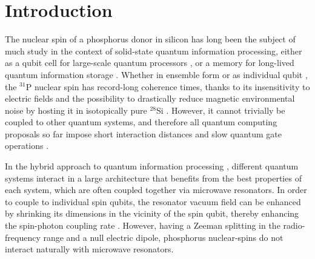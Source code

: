 \documentclass[
 aps,prb,twocolumn,
 amsmath,amssymb,superscriptaddress,
] {revtex4-1}
\begin{document}
\maketitle

\section{Introduction}

The nuclear spin of a phosphorus donor in silicon has long been the subject of much study in the context of solid-state quantum information processing, either as a qubit cell for large-scale quantum processors \cite{Kane1998,Ogorman2016,Hill2015}, or a memory for long-lived quantum information storage \cite{Morton2008,Freer2017}. Whether in ensemble form \cite{Saeedi2013} or as individual qubit \cite{Muhonen2014}, the $^{31}$P nuclear spin has record-long coherence times, thanks to its insensitivity to electric fields and the possibility to drastically reduce magnetic environmental noise by hosting it in isotopically pure $^{28}$Si \cite{Itoh2014}. However, it cannot trivially be coupled to other quantum systems, and therefore all quantum computing proposals so far impose short interaction distances and slow quantum gate operations \cite{Kane1998,Ogorman2016,Hill2015}.

In the hybrid approach to quantum information processing \cite{Xiang2013}, different quantum systems interact in a large architecture that benefits from the best properties of each system, which are often coupled together via microwave resonators. In order to couple to individual spin qubits, the resonator vacuum field can be enhanced by shrinking its dimensions in the vicinity of the spin qubit, thereby enhancing the spin-photon coupling rate \cite{Tosi2014,Jenkins2016,Haikka2017,Sarabi2017}. However, having a Zeeman splitting in the radio-frequency range and a null electric dipole, phosphorus nuclear-spins do not interact naturally with microwave resonators.
\end{document}
